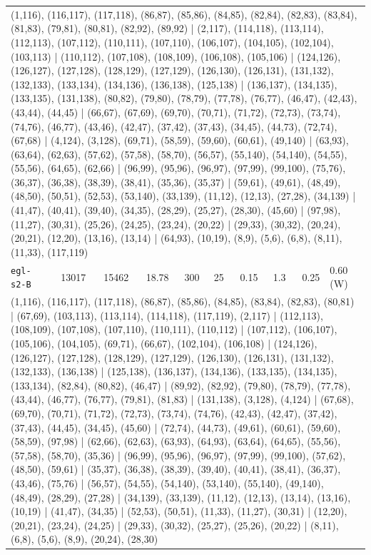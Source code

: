 \begin{longtable}{lrrrrrrrrl}
\multicolumn{10}{p{0.96\linewidth}}{\tiny\raggedright\arraybackslash (1,116), (116,117), (117,118), (86,87), (85,86), (84,85), (82,84), (82,83), (83,84), (81,83), (79,81), (80,81), (82,92), (89,92) | (2,117), (114,118), (113,114), (112,113), (107,112), (110,111), (107,110), (106,107), (104,105), (102,104), (103,113) | (110,112), (107,108), (108,109), (106,108), (105,106) | (124,126), (126,127), (127,128), (128,129), (127,129), (126,130), (126,131), (131,132), (132,133), (133,134), (134,136), (136,138), (125,138) | (136,137), (134,135), (133,135), (131,138), (80,82), (79,80), (78,79), (77,78), (76,77), (46,47), (42,43), (43,44), (44,45) | (66,67), (67,69), (69,70), (70,71), (71,72), (72,73), (73,74), (74,76), (46,77), (43,46), (42,47), (37,42), (37,43), (34,45), (44,73), (72,74), (67,68) | (4,124), (3,128), (69,71), (58,59), (59,60), (60,61), (49,140) | (63,93), (63,64), (62,63), (57,62), (57,58), (58,70), (56,57), (55,140), (54,140), (54,55), (55,56), (64,65), (62,66) | (96,99), (95,96), (96,97), (97,99), (99,100), (75,76), (36,37), (36,38), (38,39), (38,41), (35,36), (35,37) | (59,61), (49,61), (48,49), (48,50), (50,51), (52,53), (53,140), (33,139), (11,12), (12,13), (27,28), (34,139) | (41,47), (40,41), (39,40), (34,35), (28,29), (25,27), (28,30), (45,60) | (97,98), (11,27), (30,31), (25,26), (24,25), (23,24), (20,22) | (29,33), (30,32), (20,24), (20,21), (12,20), (13,16), (13,14) | (64,93), (10,19), (8,9), (5,6), (6,8), (8,11), (11,33), (117,119)} \\[2pt]
\texttt{egl-s2-B} & 13017 & 15462 & 18.78 & 300 & 25 & 0.15 & 1.3 & 0.25 & 0.60\,(W) \\
\multicolumn{10}{p{0.96\linewidth}}{\tiny\raggedright\arraybackslash (1,116), (116,117), (117,118), (86,87), (85,86), (84,85), (83,84), (82,83), (80,81) | (67,69), (103,113), (113,114), (114,118), (117,119), (2,117) | (112,113), (108,109), (107,108), (107,110), (110,111), (110,112) | (107,112), (106,107), (105,106), (104,105), (69,71), (66,67), (102,104), (106,108) | (124,126), (126,127), (127,128), (128,129), (127,129), (126,130), (126,131), (131,132), (132,133), (136,138) | (125,138), (136,137), (134,136), (133,135), (134,135), (133,134), (82,84), (80,82), (46,47) | (89,92), (82,92), (79,80), (78,79), (77,78), (43,44), (46,77), (76,77), (79,81), (81,83) | (131,138), (3,128), (4,124) | (67,68), (69,70), (70,71), (71,72), (72,73), (73,74), (74,76), (42,43), (42,47), (37,42), (37,43), (44,45), (34,45), (45,60) | (72,74), (44,73), (49,61), (60,61), (59,60), (58,59), (97,98) | (62,66), (62,63), (63,93), (64,93), (63,64), (64,65), (55,56), (57,58), (58,70), (35,36) | (96,99), (95,96), (96,97), (97,99), (99,100), (57,62), (48,50), (59,61) | (35,37), (36,38), (38,39), (39,40), (40,41), (38,41), (36,37), (43,46), (75,76) | (56,57), (54,55), (54,140), (53,140), (55,140), (49,140), (48,49), (28,29), (27,28) | (34,139), (33,139), (11,12), (12,13), (13,14), (13,16), (10,19) | (41,47), (34,35) | (52,53), (50,51), (11,33), (11,27), (30,31) | (12,20), (20,21), (23,24), (24,25) | (29,33), (30,32), (25,27), (25,26), (20,22) | (8,11), (6,8), (5,6), (8,9), (20,24), (28,30)} \\[2pt]

\end{longtable}
